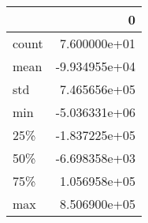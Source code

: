 \begin{tabular}{lr}
\toprule
{} &             0 \\
\midrule
count &  7.600000e+01 \\
mean  & -9.934955e+04 \\
std   &  7.465656e+05 \\
min   & -5.036331e+06 \\
25\%   & -1.837225e+05 \\
50\%   & -6.698358e+03 \\
75\%   &  1.056958e+05 \\
max   &  8.506900e+05 \\
\bottomrule
\end{tabular}
